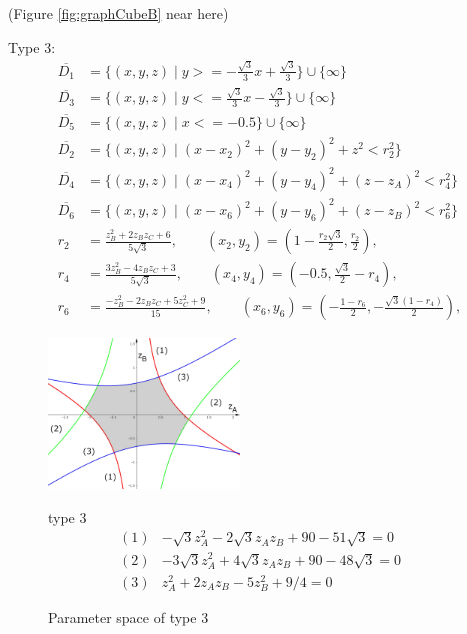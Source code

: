 \documentclass[suppldata, dvipdfmx]{interact}
\theoremstyle{plain}%
\theoremstyle{definition}
\theoremstyle{remark}
\theoremstyle{problemstyle}
\begin{document}
\noindent(Figure \ref{fig:graphCubeB} near here)

\bigskip\par
Type 3:
\begin{align*}
\overline{D_1}&=\{(x,y,z) \mid y >= -\frac{\sqrt{3}}{3}x + \frac{\sqrt{3}}{3}\} \cup \{ \infty \}\\
\overline{D_3}&=\{(x,y,z) \mid y <= \frac{\sqrt{3}}{3}x - \frac{\sqrt{3}}{3} \} \cup\{\infty\}\\
\overline{D_5}&=\{(x,y,z) \mid x <= -0.5 \} \cup\{\infty\}\\
\overline{D_2}&=\{(x,y,z) \mid (x-x_2)^2+(y-y_2)^2+z^2<r_2^2 \} \\
\overline{D_4}&=\{(x,y,z) \mid (x-x_4)^2+(y-y_4)^2+(z-z_A)^2<r_4^2 \} \\
\overline{D_6}&=\{(x,y,z) \mid (x-x_6)^2+(y-y_6)^2+(z-z_B)^2<r_6^2 \} \\
 r_2 &= \frac{z_B^2 + 2z_Bz_C + 6}{5\sqrt{3}}, \qquad
(x_2, y_2) = \left(1-\frac{r_2\sqrt{3}}{2}, \frac{r_2}{2}\right),\\
 r_4 &= \frac{3z_B^2 - 4z_Bz_C + 3}{5\sqrt{3}}, \qquad
(x_4, y_4) = \left(-0.5, \frac{\sqrt{3}}{2} - r_4\right),\\
 r_6 &= \frac{-z_B^2 - 2z_Bz_C + 5z_C^2+ 9}{15}, \qquad
(x_6, y_6) = \left(-\frac{1 - r_6}{2}, - \frac{\sqrt{3}(1 - r_4)}{2}\right),
\end{align*} 
\begin{figure}[h]
 \begin{minipage}[]{0.5\textwidth}
 \centering
 \includegraphics[width=2in,
 keepaspectratio]{./img/graph/cubeC.jpg}
 \caption{Parameter space of type 3}
 \label{fig:graphCubeC}
 \end{minipage}
 \hspace*{\fill}
 \begin{minipage}[]{0.5\textwidth}
  \centering
  type 3
  \begin{align*}
   (1)& -\sqrt{3}z_A^2 - 2\sqrt{3}z_Az_B + 90 - 51\sqrt{3} = 0\\
   (2)& -3\sqrt{3}z_A^2 + 4\sqrt{3}z_A z_B + 90 - 48\sqrt{3} = 0\\
   (3)& z_A^2 + 2 z_A z_B - 5z_B^2 + 9/4 = 0
  \end{align*}
 \end{minipage}
 \hspace*{\fill}
\end{figure}
\end{document}
